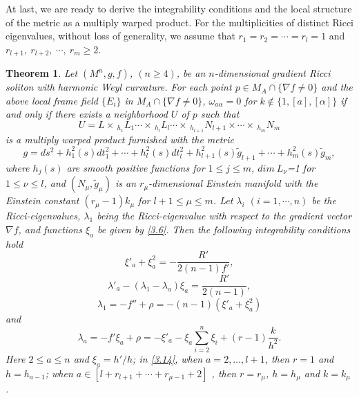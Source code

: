\documentclass{amsart}
\newtheorem{theorem}{Theorem}[section]
\theoremstyle{definition}
\theoremstyle{remark}
\numberwithin{equation}{section}
\begin{document}
	
	At last, we are ready to derive the integrability conditions and the local structure of the metric as a multiply warped product. 
	For the multiplicities of distinct Ricci eigenvalues, without loss of generality, 
	we assume that $r_{1}=r_{2}=\cdots=r_{l}=1$ and 
	$r_{l+1},~ r_{l+2},~\cdots,~ r_{m} \geq2$.  
	\begin{theorem} \label{mulwar}
		Let $(M^n, g, f)$, $(n\geq 4)$, be an $n$-dimensional gradient Ricci soliton with harmonic Weyl curvature. 
		For each point $p \in M_A \cap \{ \nabla f \neq 0  \}$ and the above local frame field $\{ E_i \}$ in $M_{A} \cap \{ \nabla f \neq 0 \}$, $\omega_{a\alpha}=0$ for $k \notin \{1,[a],[\alpha]\}$ if and only if there exists a neighborhood $U$ of $p$ 
		such that 
		\[
		U = L\times\,  _{h_1}L_1 \cdots \times\, _{h_l}L_l\cdots \times\, _{h_{l+1}}N_{l+1}\times\cdots \times\, _{h_m}N_{m}
		\]
		is a multiply warped product furnished with the metric 
		\begin{equation} \label{3.10}
			g= ds^2 + h^2_1(s)  dt_1^2 + \cdots 
			+ h^2_l(s) dt_l^2+ h^2_{l+1}(s) \tilde{g}_{l+1}+ \cdots 
			+h^2_{m}(s) \tilde{g}_{m},
		\end{equation}
		where $h_j(s)$ are smooth positive functions for $1\leq j \leq m$,
		$dim ~L_\nu$=1 for $1\leq \nu \leq l$, and 
		$(N_\mu, \tilde{g}_{\mu})$ is an $r_\mu$-dimensional Einstein manifold 
		with the Einstein constant $(r_\mu-1)k_\mu$ for $l+1\leq \mu \leq m$.
		Let $\lambda_i$ $(i=1,\cdots, n)$ be the Ricci-eigenvalues, $\lambda_1$ being the Ricci-eigenvalue with respect to the gradient vector $\nabla f$,
		and functions $\xi_a$ be given by \eqref{3.6}.	
		Then the following integrability conditions hold
		\begin{equation}%
			\xi'_a+\xi^2_a=-\frac{R'}{2(n-1)f'},
		\end{equation}
		\begin{equation}%
			\lambda'_a-\left(\lambda_1-\lambda_a \right)\xi_a=\frac{R'}{2(n-1)},
		\end{equation}
		\begin{equation}%
			\lambda_{1}=-f''+\rho=-(n-1)\left( \xi'_a+\xi^2_a\right)
		\end{equation}
		and
		\begin{equation}\label{3.14}
			\lambda_a=-f'\xi_a+\rho=- \xi'_a-\xi_a \sum^{n}_{i=2} \xi_i +( r-1)\frac{k}{h^2}.
		\end{equation}
		Here $2\leq a\leq n$ and $\xi_a=h'/h$;  in \eqref{3.14}, when $a=2, \dots, l+1$,  then 
		$r=1$ and $h=h_{a-1}$;
		when $a\in \left[ l+r_{l+1}+\cdots+r_{\mu-1} +2\right]$ ,  then 
		$r=r_\mu$, $h=h_{\mu} $ and $k=k_{\mu} $.
	\end{theorem}
	
\end{document}
